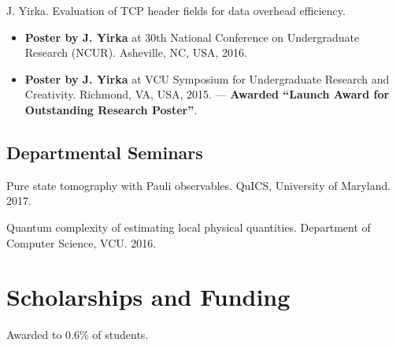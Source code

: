 \documentclass[11pt,letterpaper,serif]{moderncv}
\newcommand{\pubItemSep}{0.3em}
\begin{document}
J. Yirka. Evaluation of TCP header fields for data overhead efficiency.
\begin{adjustwidth}{.25in}{}
	\begin{itemize}[itemsep=\pubItemSep]
		\item \textbf{Poster by J. Yirka} at 30th National Conference on Undergraduate Research (NCUR). Asheville, NC, USA, 2016.
		\item \textbf{Poster by J. Yirka} at VCU Symposium for Undergraduate Research and Creativity. Richmond, VA, USA, 2015. --- \textbf{Awarded ``Launch Award for Outstanding Research Poster''}.	
	\end{itemize}
\end{adjustwidth}


\subsection{Departmental Seminars}
{ \leftskip 0.2in \parindent -0.2in %
	
Pure state tomography with Pauli observables. QuICS, University of Maryland. 2017.

Quantum complexity of estimating local physical quantities. Department of Computer Science, VCU. 2016.

}


\section{Scholarships and Funding \hspace{2em}{\footnotesize (all dollar amounts in USD)}}
{	
	\begin{adjustwidth}{.25in}{}
		Awarded to 0.6\% of students. 
	\end{adjustwidth}
}

\vspace{\baselineskip}

\end{document}

